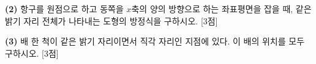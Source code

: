 \documentclass[10pt]{article}
\begin{document}
\begin{pagepair}
{\textbf{(2)} 항구를 원점으로 하고 동쪽을 $x$축의 양의 방향으로 하는 좌표평면을 잡을 때, 같은 밝기 자리 전체가 나타내는 도형의 방정식을 구하시오. [3점]
\vfill

\textbf{(3)} 배 한 척이 같은 밝기 자리이면서 직각 자리인 지점에 있다. 이 배의 위치를 모두 구하시오. [3점]
\vspace*{-13.5mm}
\vfill\null
}
\end{pagepair}
\end{document}
